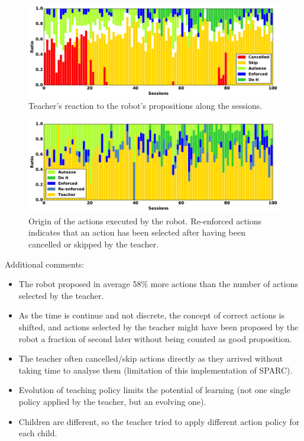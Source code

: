 \begin{figure}[ht]
	\includegraphics[width=1\linewidth]{propositions.pdf}
	\centering
	\caption{Teacher's reaction to the robot's propositions along the sessions.}
	\label{fig:supervision}
\end{figure}


\begin{figure}[ht]
	\includegraphics[width=1\linewidth]{selections.pdf}
	\centering
	\caption{Origin of the actions executed by the robot. Re-enforced actions indicates that an action has been selected after having been cancelled or skipped by the teacher.}
	\label{fig:supervision}
\end{figure}

Additional comments:
\begin{itemize}
	\item The robot proposed in average 58\% more actions than the number of actions selected by the teacher.
	\item As the time is continue and not discrete, the concept of correct actions is shifted, and actions selected by the teacher might have been proposed by the robot a fraction of second later without being counted as good proposition.
	\item The teacher often cancelled/skip actions directly as they arrived without taking time to analyse them (limitation of this implementation of SPARC).
	\item Evolution of teaching policy limits the potential of learning (not one single policy applied by the teacher, but an evolving one).
	\item Children are different, so the teacher tried to apply different action policy for each child.
\end{itemize}


